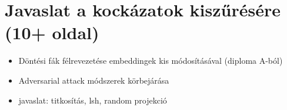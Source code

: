 \section{Javaslat a kockázatok kiszűrésére (10+ oldal)}
\label{sec:6}

\begin{itemize}
	\item Döntési fák félrevezetése embeddingek kis módosításával (diploma A-ból)
	\item Adversarial attack módszerek körbejárása
	\item javaslat: titkosítás, lsh, random projekció %
\end{itemize}